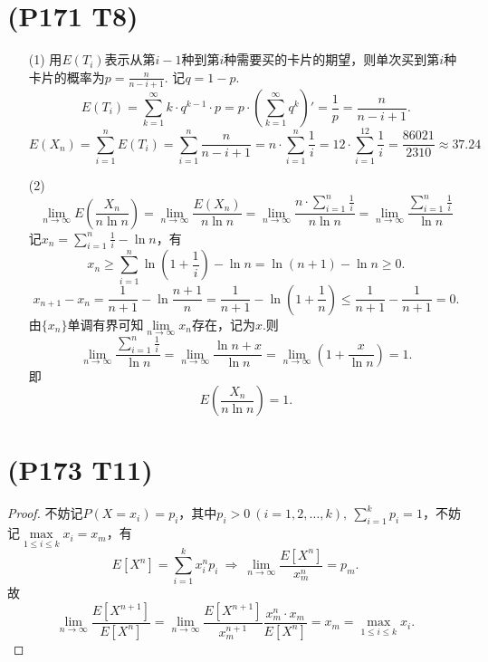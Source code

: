 \documentclass{article}
\begin{document}
\section{(P171 T8)}  %
\begin{enumerate}
    \item [(1)]
    用$E(T_i)$表示从第$i-1$种到第$i$种需要买的卡片的期望，则单次买到第$i$种卡片的概率为$p=\displaystyle{\frac{n}{n-i+1}}$.
    记$q = 1 - p$.
    \[
        E(T_i) 
        = \sum\limits_{k=1}^{\infty} k\cdot q^{k-1}\cdot p
        = p \cdot \left(\sum\limits_{k=1}^{\infty} q^{k} \right)'
        = \frac{1}{p}
        = \frac{n}{n-i+1}.
    \]
    \[
        E(X_n)
        = \sum\limits_{i=1}^{n} E(T_i)
        = \sum\limits_{i=1}^{n} \frac{n}{n-i+1}
        = n \cdot \sum\limits_{i=1}^{n} \frac{1}{i}
        = 12 \cdot \sum\limits_{i=1}^{12} \frac{1}{i}
        = \frac{86021}{2310}
        \approx 37.24
    \]
    \item [(2)]
    \[
        \lim\limits_{n\to \infty} E\left(\frac{X_n}{n \ln n} \right)
        = \lim\limits_{n\to \infty} \frac{E(X_n)}{n \ln n}   
        = \lim\limits_{n\to \infty} \frac{n \cdot \sum\limits_{i=1}^{n} \frac{1}{i} }{n \ln n}   
        = \lim\limits_{n\to \infty} \frac{\sum\limits_{i=1}^{n} \frac{1}{i} }{\ln n}   
    \]
    记$x_n = \sum\limits_{i=1}^{n} \frac{1}{i} - \ln n$，有
    \[
        x_n 
        \geq \sum\limits_{i=1}^{n} \ln (1+\frac{1}{i}) - \ln n
        = \ln (n+1) - \ln n
        \geq 0.
    \]
    \[
        x_{n+1} - x_n 
        = \frac{1}{n+1} - \ln \frac{n+1}{n}
        = \frac{1}{n+1} - \ln \left(1+\frac{1}{n}\right)
        \leq \frac{1}{n+1} - \frac{1}{n+1}
        = 0.
    \]
    由$\{x_n\}$单调有界可知$\lim\limits_{n\to \infty} x_n$存在，记为$x$.则
    \[
        \lim\limits_{n\to \infty} \frac{\sum\limits_{i=1}^{n} \frac{1}{i} }{\ln n}   
        =
        \lim\limits_{n\to \infty} \frac{\ln n + x}{\ln n}
        =
        \lim\limits_{n\to \infty} \left(1 + \frac{x}{\ln n}\right)
        =
        1.
    \]
    即
    \[
        E\left(\frac{X_n}{n \ln n}\right) = 1.    
    \]
\end{enumerate}

\section{(P173 T11)}  %
\begin{proof}
    不妨记$P(X=x_i) = p_i$，其中$p_i >0\ (i=1,2,\ldots,k),\ \sum\limits_{i=1}^{k} p_i =1$，不妨记$\max\limits_{1\leq i \leq k} x_i = x_m$，有
    \[
        E[X^n] = \sum\limits_{i=1}^{k} x_i^n p_i
        \ \Rightarrow\ 
        \lim\limits_{n\to \infty} \frac{E[X^n]}{x_m^n} = p_m .
    \]
    故
    \[
        \lim\limits_{n\to \infty} \frac{E[X^{n+1}]}{E[X^n]} 
        =
        \lim\limits_{n\to \infty} \frac{E[X^{n+1}]}{x_m^{n+1}} \frac{x_m^n \cdot x_m}{E[X^n]} 
        =
        x_m
        =
        \max\limits_{1\leq i \leq k} x_i .
    \]
\end{proof}
\end{document}
